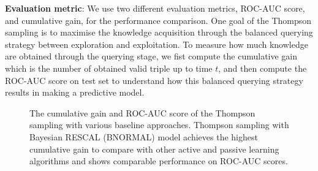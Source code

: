 \textbf{Evaluation metric}: We use two different evaluation metrics, ROC-AUC score, and cumulative gain,
for the performance comparison. One goal of the Thompson sampling is to maximise the knowledge 
acquisition through the balanced querying strategy between exploration and exploitation. 
To measure how much knowledge are obtained through the querying stage, we fist compute the cumulative 
gain which is the number of obtained valid triple up to time $t$, and then compute the ROC-AUC score on 
test set to understand how this balanced querying strategy results in making a predictive model.

\begin{figure}[t]
	\centering
	
	\caption{\label{fig:c_gain}The cumulative gain and ROC-AUC score of the Thompson sampling 
	with various baseline approaches. Thompson sampling with Bayesian RESCAL (BNORMAL)
	model achieves the highest cumulative gain to compare with other active and 
	passive learning algorithms and shows comparable performance on ROC-AUC scores.}
\end{figure}

